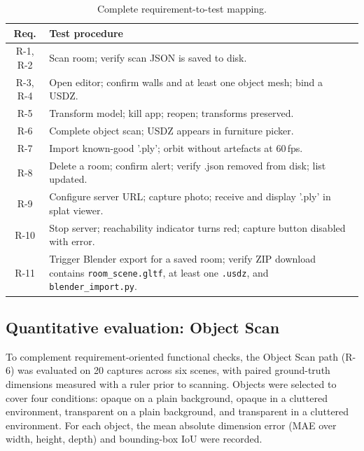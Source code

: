 

\begin{table}[H]
\centering
\caption{Complete requirement-to-test mapping.}
\label{tab:test_map}
\begin{tabular}{|c|p{}|}
\hline
\textbf{Req.} & \textbf{Test procedure} \\
\hline
R-1, R-2 & Scan room; verify scan JSON is saved to disk. \\
\hline
R-3, R-4 & Open editor; confirm walls and at least one object mesh; bind a USDZ. \\
\hline
R-5 & Transform model; kill app; reopen; transforms preserved. \\
\hline
R-6 & Complete object scan; USDZ appears in furniture picker. \\
\hline
R-7 & Import known-good '.ply'; orbit without artefacts at 60\,fps. \\
\hline
R-8 & Delete a room; confirm alert; verify .json removed from disk; list updated. \\
\hline
R-9 & Configure server URL; capture photo; receive and display '.ply' in splat viewer. \\
\hline
R-10 & Stop server; reachability indicator turns red; capture button disabled with error. \\
\hline
R-11 & Trigger Blender export for a saved room; verify ZIP download contains \texttt{room\_scene.gltf}, at least one \texttt{.usdz}, and \texttt{blender\_import.py}. \\
\hline
\end{tabular}
\end{table}

\subsection{Quantitative evaluation: Object Scan}
\label{sec:object_scan_quant_eval}

To complement requirement-oriented functional checks, the Object Scan path (R-6) was evaluated on 20 captures across six scenes, with paired ground-truth dimensions measured with a ruler prior to scanning. Objects were selected to cover four conditions: opaque on a plain background, opaque in a cluttered environment, transparent on a plain background, and transparent in a cluttered environment. For each object, the mean absolute dimension error (MAE over width, height, depth) and bounding-box IoU were recorded.

